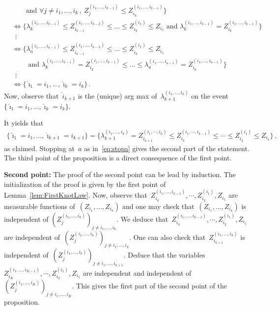 \documentclass[final,numbib]{imaiai}%
\numberwithin{equation}{section}
\renewcommand{\hat}{\widehat}
\def\\bUnif{\text{\bUnif}}
\newcommand{\<}{\langle}
\renewcommand{\>}{\rangle}
\newcommand{\1}{\mathds{1}}
\begin{document}
{\begin{align*}
&\quad\quad \text{and }\forall j\neq i_1,\ldots, i_{k}\,,\  Z^{(i_1,\ldots, i_{k-1})}_j\leq Z_{i_k}^{(i_1,\ldots, i_{k-1})}
\big\}\\
&\Leftrightarrow\big\{\lambda^{(i_1,\ldots, i_{k-1})}_{k}\leq Z_{i_{k-1}}^{(i_1,\ldots, i_{k-2})}\leq\ldots\leq Z_{i_2}^{(i_1)}\leq Z_{i_1} \text{ and }\lambda^{(i_1,\ldots, i_{k-1})}_{k}=Z_{i_k}^{(i_1,\ldots, i_{k-1})}
\big\}\\
&\ \  \vdots\\
&\Leftrightarrow\big\{\lambda^{(i_1,\ldots, i_{a-1})}_{a}\leq Z_{i_{a-1}}^{(i_1,\ldots, i_{a-2})}\leq\ldots\leq Z_{i_2}^{(i_1)}\leq Z_{i_1}\\
&\quad\quad  \text{ and }\lambda^{(i_1,\ldots, i_{k-1})}_{k}= Z_{i_k}^{(i_1,\ldots, i_{k-1})}
\leq\ldots\leq \lambda^{(i_1,\ldots, i_{a-1})}_{a}=Z_{i_a}^{(i_1,\ldots, i_{a-1})}
\big\}\tag{$s_a$}\label{eq:stopa}\\
&\ \  \vdots\\
&\Leftrightarrow\big\{\hat \imath_1=i_1,\ldots,\hat \imath_{k}=i_{k}\big\}\,.
\end{align*}
Now, observe that~$\hat i_{k+1}$ is the (unique) arg max of~$\lambda_{k+1}^{(i_1,\ldots, i_{k})}$ on the event~$\big\{\hat \imath_1=i_1,\ldots,\hat \imath_{k}=i_{k}\big\}$. 


\noindent It yields that 
\begin{align*}
\big\{\hat \imath_1=i_1,\ldots,\hat \imath_{k+1}=i_{k+1}\big\}=\big\{
\lambda_{k+1}^{(i_1,\ldots, i_{k})}=Z_{i_{k+1}}^{(i_1,\cdots, i_{k})}%
\leq %
Z_{i_k}^{(i_1,\cdots, i_{k-1})}\leq\cdots\leq %
Z_{i_2}^{(i_1)}\leq%
Z_{i_1}\big\}\,,
\end{align*}
as claimed. Stopping at~$a$ as in~\eqref{eq:stopa} gives the second part of the statement. The third point of the proposition is a direct consequence of the first point.

\medskip

\noindent
{\bf Second point: }The proof of the second point can be lead by induction. The initialization of the proof is given by the first point of Lemma~\ref{lem:FirstKnotLaw}. Now, observe that~$Z_{i_{k}}^{(i_1,\ldots, i_{k-1})}, \cdots, Z_{i_{2}}^{(i_1)}, Z_{i_1}$ are measurable functions of~$(Z_{i_1},\ldots,Z_{i_{k}})$ and one may check that~$(Z_{i_1},\ldots,Z_{i_{k}})$ is independent of $(Z^{(i_1,\ldots, i_{k})}_j)_{ j\neq i_1, \ldots, i_{k}}$. We deduce that~$Z_{i_{k}}^{(i_1,\ldots, i_{k-1})}, \cdots, Z_{i_{2}}^{(i_1)}, Z_{i_1}$ are independent of~$(Z^{(i_1,\ldots, i_{k})}_j)_{ j\neq i_1, \ldots, i_{k}}$. One can also check that~$Z_{i_{k+1}}^{(i_1,\ldots, i_{k})}$ is independent of~$(Z^{(i_1,\ldots, i_{k})}_j)_{ j\neq i_1, \ldots, i_{k+1}}$.  Deduce that the variables $Z_{i_{K}}^{(i_1,\ldots, i_{K-1})}, \cdots, Z_{i_{2}}^{(i_1)}, Z_{i_1}$ are independent and independent of $(Z^{(i_1,\ldots, i_{K})}_j)_{ j\neq i_1, \ldots, i_{K}}$. This gives the first part of the second point of the proposition. 

}
\end{document}
